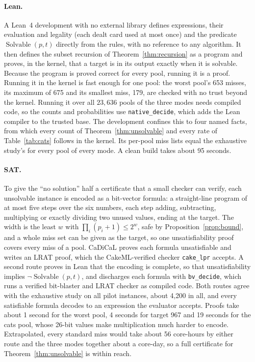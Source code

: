 \documentclass[11pt,a4paper]{article}
\theoremstyle{definition}
\theoremstyle{remark}
\begin{document}
\paragraph{Lean.}
A Lean~4 development with no external library defines expressions, their evaluation and legality
(each dealt card used at most once) and the predicate $\operatorname{Solvable}(p, t)$ directly from the
rules, with no reference to any algorithm. It then defines the subset recursion of
Theorem~\ref{thm:recursion} as a program and proves, in the kernel, that a target is in its output exactly
when it is solvable. Because the program is proved correct for every pool, running it is a proof. Running
it in the kernel is fast enough for one pool: the worst pool's 653 misses, its maximum of 675 and its
smallest miss, 179, are checked with no trust beyond the kernel. Running it over all $23{,}636$ pools of the
three modes needs compiled code, so the counts and probabilities use \texttt{native\_decide}, which adds
the Lean compiler to the trusted base. The development confines this to four named facts, from which every
count of Theorem~\ref{thm:unsolvable} and every rate of Table~\ref{tab:cats} follows in the kernel. Its
per-pool miss lists equal the exhaustive study's for every pool of every mode. A clean build takes about
95 seconds.

\paragraph{SAT.}
To give the ``no solution'' half a certificate that a small checker can verify, each unsolvable instance
is encoded as a bit-vector formula: a straight-line program of at most five steps over the six numbers,
each step adding, subtracting, multiplying or exactly dividing two unused values, ending at the target.
The width is the least $w$ with $\prod_i (p_i + 1) \le 2^w$, safe by Proposition~\ref{prop:bound}, and a
whole miss set can be given as the target, so one unsatisfiability proof covers every miss of a pool.
CaDiCaL proves each formula unsatisfiable and writes an LRAT proof, which the CakeML-verified checker
\texttt{cake\_lpr} accepts. A second route proves in Lean that the encoding is complete, so that
unsatisfiability implies $\neg\operatorname{Solvable}(p, t)$, and discharges each formula with
\texttt{bv\_decide}, which runs a verified bit-blaster and LRAT checker as compiled code. Both routes agree
with the exhaustive study on all pilot instances, about 4{,}200 in all, and every satisfiable formula
decodes to an expression the evaluator accepts. Proofs take about 1 second for the worst pool, 4 seconds
for target 967 and 19 seconds for the cats pool, whose 26-bit values make multiplication much harder to
encode. Extrapolated, every standard miss would take about 56 core-hours by either route and the three
modes together about a core-day, so a full certificate for Theorem~\ref{thm:unsolvable} is within reach.
\end{document}
